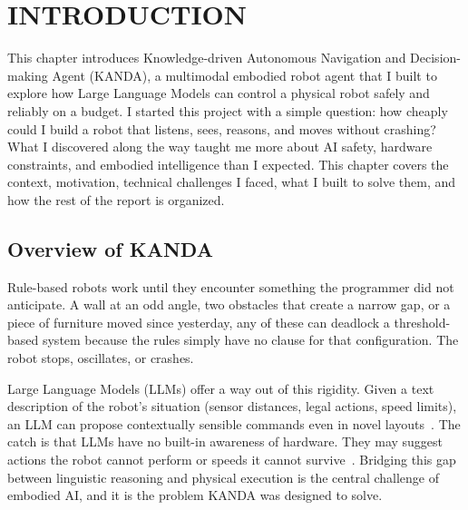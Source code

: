 \chapter{INTRODUCTION}
\label{ch:intro}

This chapter introduces Knowledge-driven Autonomous Navigation and Decision-making Agent (KANDA), a multimodal embodied robot agent that I built to explore how Large Language Models can control a physical robot safely and reliably on a budget. I started this project with a simple question: how cheaply could I build a robot that listens, sees, reasons, and moves without crashing? What I discovered along the way taught me more about AI safety, hardware constraints, and embodied intelligence than I expected. This chapter covers the context, motivation, technical challenges I faced, what I built to solve them, and how the rest of the report is organized.

\section{Overview of KANDA}
\label{sec:overview}

Rule-based robots work until they encounter something the programmer did not anticipate. A wall at an odd angle, two obstacles that create a narrow gap, or a piece of furniture moved since yesterday, any of these can deadlock a threshold-based system because the rules simply have no clause for that configuration. The robot stops, oscillates, or crashes.

Large Language Models (LLMs) offer a way out of this rigidity. Given a text description of the robot's situation (sensor distances, legal actions, speed limits), an LLM can propose contextually sensible commands even in novel layouts~\cite{vaswani2017attention}. The catch is that LLMs have no built-in awareness of hardware. They may suggest actions the robot cannot perform or speeds it cannot survive~\cite{driess2023palme}. Bridging this gap between linguistic reasoning and physical execution is the central challenge of embodied AI, and it is the problem KANDA was designed to solve.

